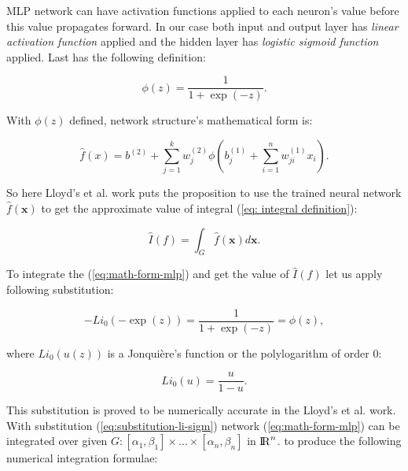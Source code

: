 \documentclass[%
]{ittmm}
\begin{document}
MLP network can have activation functions applied to each neuron's value before this value propagates forward. In our case both input and output layer has \textit{linear activation function} applied and the hidden layer has \textit{logistic sigmoid function} applied. Last has the following definition:

\begin{equation}
    \label{eq:sigmoid}
    \phi(z) = \frac{1}{1+\exp(-z)}.
\end{equation}

\noindent With $\phi(z)$ defined, network structure's mathematical form is:

\begin{equation}
    \label{eq:math-form-mlp}
    \hat{f}(x) = b^{(2)} + \sum_{j=1}^{k}w_j^{(2)}\phi(b_j^{(1)}+\sum_{i=1}^{n}w_{ji}^{(1)}x_{i}).
\end{equation}

So here Lloyd's et al. work puts the proposition to use the trained neural network $\hat{f}(\mathbf{x})$ to get the approximate value of integral (\ref{eq: integral definition}):

\begin{equation}
    \label{eq: ihatdef}
    \hat{I}(f) = \int_G \hat{f}(\mathbf{x})d\mathbf{x}.
\end{equation}

\noindent To integrate the (\ref{eq:math-form-mlp}) and get the value of $\hat{I}(f)$ let us apply following substitution:

\begin{equation}
    \label{eq:substitution-li-sigm}
    -Li_0(-\exp(z)) = \frac{1}{1+\exp(-z)} = \phi(z),
\end{equation}

\noindent where $Li_0(u(z))$ is a Jonquière's function or the polylogarithm of order 0:

\begin{equation}
    \label{eq:li0-def}
    Li_0(u) = \frac{u}{1 - u}.
\end{equation}

\noindent This substitution is proved to be numerically accurate in the Lloyd's et al. work\cite{lloyd2020using}. With substitution (\ref{eq:substitution-li-sigm}) network (\ref{eq:math-form-mlp}) can be integrated over given $G: [\alpha_1, \beta_1] \times...\times[\alpha_n, \beta_n]$ in ${\rm I\!R}^n$. to produce the following numerical integration formulae:
\end{document}
